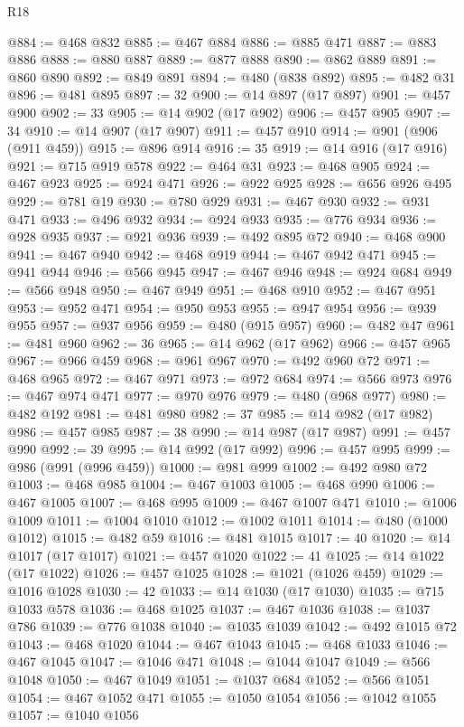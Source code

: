 \begin{lexlean}{R18}
\begin{coremodule}
@884 := @468 @832
@885 := @467 @884
@886 := @885 @471
@887 := @883 @886
@888 := @880 @887
@889 := @877 @888
@890 := @862 @889
@891 := @860 @890
@892 := @849 @891
@894 := @480 (@838 @892)
@895 := @482 @31
@896 := @481 @895
@897 := 32
@900 := @14 @897 (@17 @897)
@901 := @457 @900
@902 := 33
@905 := @14 @902 (@17 @902)
@906 := @457 @905
@907 := 34
@910 := @14 @907 (@17 @907)
@911 := @457 @910
@914 := @901 (@906 (@911 @459))
@915 := @896 @914
@916 := 35
@919 := @14 @916 (@17 @916)
@921 := @715 @919 @578
@922 := @464 @31
@923 := @468 @905
@924 := @467 @923
@925 := @924 @471
@926 := @922 @925
@928 := @656 @926 @495
@929 := @781 @19
@930 := @780 @929
@931 := @467 @930
@932 := @931 @471
@933 := @496 @932
@934 := @924 @933
@935 := @776 @934
@936 := @928 @935
@937 := @921 @936
@939 := @492 @895 @72
@940 := @468 @900
@941 := @467 @940
@942 := @468 @919
@944 := @467 @942 @471
@945 := @941 @944
@946 := @566 @945
@947 := @467 @946
@948 := @924 @684
@949 := @566 @948
@950 := @467 @949
@951 := @468 @910
@952 := @467 @951
@953 := @952 @471
@954 := @950 @953
@955 := @947 @954
@956 := @939 @955
@957 := @937 @956
@959 := @480 (@915 @957)
@960 := @482 @47
@961 := @481 @960
@962 := 36
@965 := @14 @962 (@17 @962)
@966 := @457 @965
@967 := @966 @459
@968 := @961 @967
@970 := @492 @960 @72
@971 := @468 @965
@972 := @467 @971
@973 := @972 @684
@974 := @566 @973
@976 := @467 @974 @471
@977 := @970 @976
@979 := @480 (@968 @977)
@980 := @482 @192
@981 := @481 @980
@982 := 37
@985 := @14 @982 (@17 @982)
@986 := @457 @985
@987 := 38
@990 := @14 @987 (@17 @987)
@991 := @457 @990
@992 := 39
@995 := @14 @992 (@17 @992)
@996 := @457 @995
@999 := @986 (@991 (@996 @459))
@1000 := @981 @999
@1002 := @492 @980 @72
@1003 := @468 @985
@1004 := @467 @1003
@1005 := @468 @990
@1006 := @467 @1005
@1007 := @468 @995
@1009 := @467 @1007 @471
@1010 := @1006 @1009
@1011 := @1004 @1010
@1012 := @1002 @1011
@1014 := @480 (@1000 @1012)
@1015 := @482 @59
@1016 := @481 @1015
@1017 := 40
@1020 := @14 @1017 (@17 @1017)
@1021 := @457 @1020
@1022 := 41
@1025 := @14 @1022 (@17 @1022)
@1026 := @457 @1025
@1028 := @1021 (@1026 @459)
@1029 := @1016 @1028
@1030 := 42
@1033 := @14 @1030 (@17 @1030)
@1035 := @715 @1033 @578
@1036 := @468 @1025
@1037 := @467 @1036
@1038 := @1037 @786
@1039 := @776 @1038
@1040 := @1035 @1039
@1042 := @492 @1015 @72
@1043 := @468 @1020
@1044 := @467 @1043
@1045 := @468 @1033
@1046 := @467 @1045
@1047 := @1046 @471
@1048 := @1044 @1047
@1049 := @566 @1048
@1050 := @467 @1049
@1051 := @1037 @684
@1052 := @566 @1051
@1054 := @467 @1052 @471
@1055 := @1050 @1054
@1056 := @1042 @1055
@1057 := @1040 @1056

\end{coremodule}
\end{lexlean}
